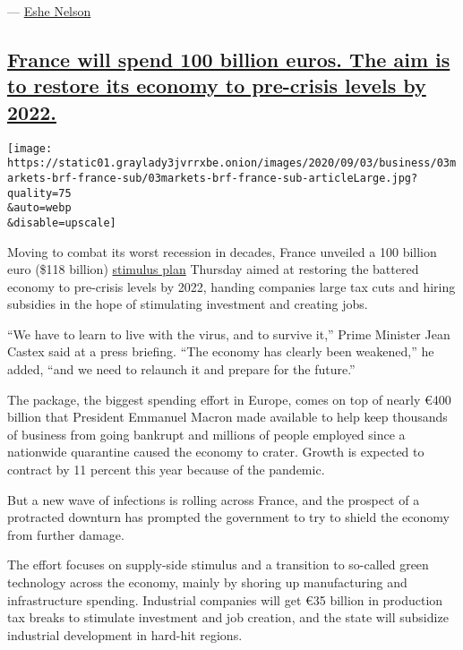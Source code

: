 --- \href{https://www.nytimes3xbfgragh.onion/by/eshe-nelson}{Eshe
Nelson}

\hypertarget{france-will-spend-100-billion-euros-the-aim-is-to-restore-its-economy-to-pre-crisis-levels-by-2022}{%
\subsection{\texorpdfstring{\protect\hyperlink{france-economy-stimulus}{France
will spend 100 billion euros. The aim is to restore its economy to
pre-crisis levels by
2022.}}{France will spend 100 billion euros. The aim is to restore its economy to pre-crisis levels by 2022.}}\label{france-will-spend-100-billion-euros-the-aim-is-to-restore-its-economy-to-pre-crisis-levels-by-2022}}

\texttt{[image: https://static01.graylady3jvrrxbe.onion/images/2020/09/03/business/03markets-brf-france-sub/03markets-brf-france-sub-articleLarge.jpg?quality=75\\\&auto=webp\\\&disable=upscale]}

Moving to combat its worst recession in decades, France unveiled a 100
billion euro (\$118 billion)
\href{https://www.economie.gouv.fr/plan-de-relance/lancement-plan-relance-3-septembre-2020}{stimulus
plan} Thursday aimed at restoring the battered economy to pre-crisis
levels by 2022, handing companies large tax cuts and hiring subsidies in
the hope of stimulating investment and creating jobs.

``We have to learn to live with the virus, and to survive it,'' Prime
Minister Jean Castex said at a press briefing. ``The economy has clearly
been weakened,'' he added, ``and we need to relaunch it and prepare for
the future.''

The package, the biggest spending effort in Europe, comes on top of
nearly €400 billion that President Emmanuel Macron made available to
help keep thousands of business from going bankrupt and millions of
people employed since a nationwide quarantine caused the economy to
crater. Growth is expected to contract by 11 percent this year because
of the pandemic.

But a new wave of infections is rolling across France, and the prospect
of a protracted downturn has prompted the government to try to shield
the economy from further damage.

The effort focuses on supply-side stimulus and a transition to so-called
green technology across the economy, mainly by shoring up manufacturing
and infrastructure spending. Industrial companies will get €35 billion
in production tax breaks to stimulate investment and job creation, and
the state will subsidize industrial development in hard-hit regions.

